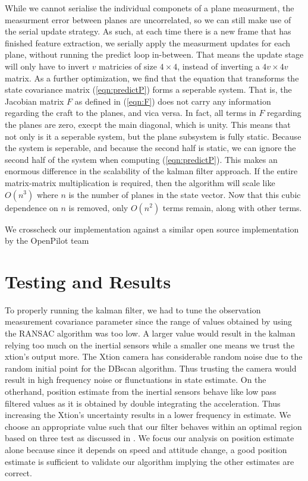 \documentclass[]{article}
\begin{document}
{While we cannot serialise the individual componets of a plane measurment, the measurment error between planes are uncorrelated, so we can still make use of the serial update strategy. As such, at each time there is a new frame that has finished feature extraction, we serially apply the measurment updates for each plane, without running the predict loop in-between.
That means the update stage will only have to invert $v$ matricies of size $4\times4$, instead of inverting a $4v \times 4v$ matrix. 
As a further optimization, we find that the equation that transforms the state covariance matrix (\ref{eqn:predictP}) forms a seperable system. That is, the Jacobian matrix $F$ as defined in (\ref{eqn:F}) does not carry any information regarding the craft to the planes, and vica versa.
In fact, all terms in $F$ regarding the planes are zero, execpt the main diagonal, which is unity. This means that not only is it a seperable system, but the plane subsystem is fully static.
Because the system is seperable, and because the second half is static, we can ignore the second half of the system when computing (\ref{eqn:predictP}).
This makes an enormous difference in the scalability of the kalman filter approach. If the entire matrix-matrix multiplication is required, then the algorithm will scale like $O(n^3)$ where $n$ is the number of planes in the state vector. Now that this cubic dependence on $n$ is removed, only $O(n^2)$ terms remain, along with other terms.

	We crosscheck our implementation against a similar open source implementation by the OpenPilot team %



\section{Testing and Results} %
\label{sub:testing_kalman}
To properly running the kalman filter, we had to tune the observation measurement covariance parameter since the range of values obtained by using the RANSAC algorithm was too low. A larger value would result in the kalman relying too much on the inertial sensors while a smaller one means we trust the xtion's output more. The Xtion camera has considerable random noise due to the random initial point for the DBscan algorithm. Thus trusting the camera would result in high frequency noise or flunctuations in state estimate. On the otherhand, position estimate from the inertial sensors behave like low pass filtered values as it is obtained by double integrating the acceleration. Thus increasing the Xtion's uncertainty results in a lower frequency in estimate. We choose an appropriate value such that our filter behaves within an optimal region based on three test as discussed in \cite{KalmanTuning} . We focus our analysis on position estimate alone because since it depends on speed and attitude change, a good position estimate is sufficient to validate our algorithm implying the other estimates are correct. 

}
\end{document}
